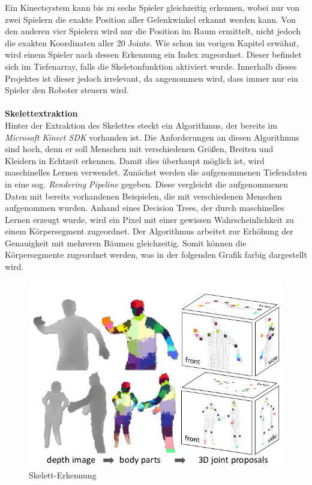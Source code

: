 Ein Kinectsystem kann bis zu sechs Spieler gleichzeitig erkennen, wobei nur von zwei Spielern die exakte Position aller Gelenkwinkel erkannt werden kann. Von den anderen vier Spielern wird nur die Position im Raum ermittelt, nicht jedoch die exakten Koordinaten aller 20 Joints. Wie schon im vorigen Kapitel erwähnt, wird einem Spieler nach dessen Erkennung ein Index zugeordnet. Dieser befindet sich im Tiefenarray, falls die Skeletonfunktion aktiviert wurde. Innerhalb dieses Projektes ist dieser jedoch irrelevant, da angenommen wird, dass immer nur ein Spieler
den Roboter steuern wird.\\ \\
\noindent
\textbf{Skelettextraktion}\\
Hinter der Extraktion des Skelettes steckt ein Algorithmus, der bereits im \textit{Microsoft Kinect SDK} vorhanden ist. 
Die Anforderungen an diesen Algorithmus sind hoch, denn er soll Menschen mit verschiedenen Größen,
Breiten und Kleidern in Echtzeit erkennen.
Damit dies überhaupt möglich ist, wird maschinelles Lernen verwendet. Zunächst werden die aufgenommenen Tiefendaten in eine sog. \textit{Rendering Pipeline}\cite{pdf:realtime_human_pose} gegeben. Diese vergleicht die aufgenommenen Daten mit bereits
vorhandenen Beispielen, die mit verschiedenen Menschen aufgenommen wurden. Anhand eines Decision Trees, der durch maschinelles Lernen erzeugt wurde, wird ein Pixel mit einer gewissen Wahrscheinlichkeit zu einem Körpersegment zugeordnet. Der Algorithmus arbeitet zur Erhöhung der Genauigkeit mit mehreren Bäumen gleichzeitig. Somit können die Körpersegmente zugeordnet werden, was in der folgenden Grafik farbig dargestellt wird.

\begin{figure}[H]						
	\centering							
	\includegraphics[scale=0.5]{Bilder/kinect_body_parts.png}			
	\caption{Skelett-Erkennung \cite{pdf:realtime_human_pose}}						
	\label{f:kinect_skeleton}						
\end{figure}


